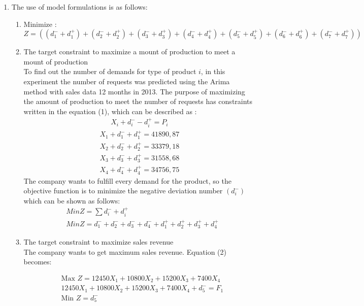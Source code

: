 \documentclass[a4paper, 12pt]{article}
\begin{document}
\begin{enumerate}[label={\alph*}]
		\item The use of model formulations is as follows:
		
			\begin{enumerate}
			\item Minimize :\\
			 $Z = ((d_1^- + d_1^+) + (d_2^- + d_2^+) +(d_3^- + d_3^+) +(d_4^- +d_4^+) + (d_5^- + d_5^+) + (d_6^- + d_6^+) +(d_7^- + d_7^+))$ 
			 \item The target constraint to maximize a mount of production to meet a mount of production\\
			 To find out the number of demands for  type of product $i$, in this experiment the number of requests was predicted using the Arima method with sales data 12 months in 2013. The purpose of maximizing the amount of production to meet the number of requests has constraints written in the equation (1), which can be described as :
			 \begin{align}
			 X_i + d_i^- - d_i^+ = P_i
			 \end{align}
			 \begin{align}
			 X_1 + d_1^- + d_1^+ = 41890,87
			 \end{align}  
			 \begin{align}
			 X_2 + d_2^- + d_2^+ = 33379,18
			 \end{align} 
			 \begin{align}
			 X_3 + d_3^- + d_3^+ = 31558,68
			 \end{align}
			 \begin{align}
			 X_4 + d_4^- + d_4^+ = 34756,75
			 \end{align}
			 The company wants to fulfill every demand for the product, so the objective function is to minimize the negative deviation number $(d_i^-)$ which can be shown as follows:
			 \begin{align}
			 &Min Z = \sum d_i^- + d_i^+ \\ 
			 &Min Z = 	d_1^- + d_2^- + d_3^- + d_4^- + d_1^+ + d_2^+ + d_3^+ + d_4^+
			 \end{align}
			 
			 \item The target constraint to maximize sales revenue\\
			 The company wants to get maximum sales revenue. Equation (2) becomes:
			 
			 \begin{align}
			 &\text{Max } Z = 12450X_1 + 10800X_2 + 15200X_3+7400X_4 \\
 			 &12450X_1 + 10800X_2+15200X_3+7400X_4+d_5^-=F_1 \\
			 &\text{Min } Z = d_5^-
			 \end{align}


\end{enumerate}
\end{enumerate}
\end{document}
